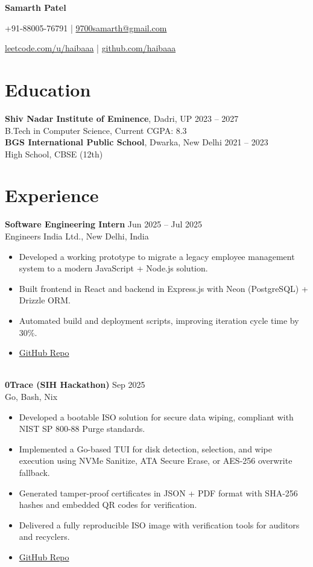 \documentclass[a4paper,10pt]{article}
\begin{document}
\centerline{\Huge \bfseries Samarth Patel}
\centerline{+91-88005-76791 \quad | \quad \href{mailto:9700samarth@gmail.com}{9700samarth@gmail.com}}
\centerline{\href{https://leetcode.com/u/haibaaa}{leetcode.com/u/haibaaa} \quad | \quad \href{https://github.com/haibaaa}{github.com/haibaaa}}

\section*{Education}
\textbf{Shiv Nadar Institute of Eminence}, Dadri, UP \hfill 2023 -- 2027 \\
B.Tech in Computer Science, Current CGPA: 8.3 \\
\textbf{BGS International Public School}, Dwarka, New Delhi \hfill 2021 -- 2023 \\
High School, CBSE (12th)

\section*{Experience}
\textbf{Software Engineering Intern} \hfill Jun 2025 -- Jul 2025 \\
Engineers India Ltd., New Delhi, India
\begin{itemize}[noitemsep, topsep=2pt]
    \item Developed a working prototype to migrate a legacy employee management system to a modern JavaScript + Node.js solution.
    \item Built frontend in React and backend in Express.js with Neon (PostgreSQL) + Drizzle ORM.
    \item Automated build and deployment scripts, improving iteration cycle time by 30\%.
    \item \href{https://github.com/manny137/EIL}{GitHub Repo}
\end{itemize} \\
\textbf{0Trace (SIH Hackathon)} \hfill Sep 2025 \\
Go, Bash, Nix
\begin{itemize}[noitemsep, topsep=2pt]
    \item Developed a bootable ISO solution for secure data wiping, compliant with NIST SP 800-88 Purge standards.
    \item Implemented a Go-based TUI for disk detection, selection, and wipe execution using NVMe Sanitize, ATA Secure Erase, or AES-256 overwrite fallback.
    \item Generated tamper-proof certificates in JSON + PDF format with SHA-256 hashes and embedded QR codes for verification.
    \item Delivered a fully reproducible ISO image with verification tools for auditors and recyclers.
    \item \href{https://github.com/spuckhafte/0trace}{GitHub Repo}
\end{itemize}
\end{document}
